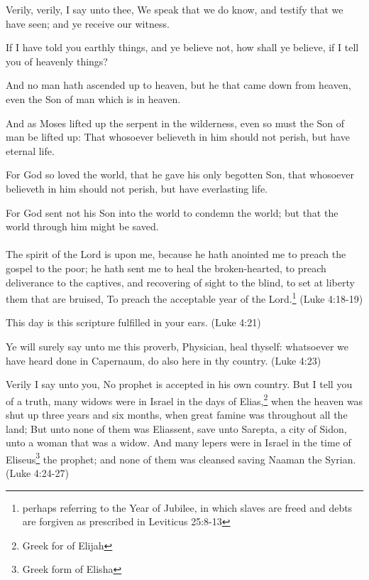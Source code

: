 Verily, verily, I say unto thee, We speak that we do know, and testify that we have seen; and ye receive our witness.

If I have told you earthly things, and ye believe not, how shall ye believe, if I tell you of heavenly things?

And no man hath ascended up to heaven, but he that came down from heaven, even the Son of man which is in heaven.

And as Moses lifted up the serpent in the wilderness, even so must the Son of man be lifted up: That whosoever believeth in him should not perish, but have eternal life.

For God so loved the world, that he gave his only begotten Son, that whosoever believeth in him should not perish, but have everlasting life. 

For God sent not his Son into the world to condemn the world; but that the world through him might be saved.

\paragraph{} The spirit of the Lord is upon me, because he hath anointed me to preach the gospel to the poor; he hath sent me to heal the broken-hearted, to preach deliverance to the captives, and recovering of sight to the blind, to set at liberty them that are bruised, To preach the acceptable year of the Lord.\footnote{perhaps referring to the Year of Jubilee, in which slaves are freed and debts are forgiven as prescribed in Leviticus 25:8-13} (Luke 4:18-19)

This day is this scripture fulfilled in your ears. (Luke 4:21)

Ye will surely say unto me this proverb, Physician, heal thyself: whatsoever we have heard done in Capernaum, do also here in thy country. (Luke 4:23)

Verily I say unto you, No prophet is accepted in his own country. But I tell you of a truth, many widows were in Israel in the days of Elias,\footnote{Greek for of Elijah} when the heaven was shut up three years and six months, when great famine was throughout all the land; But unto none of them was Elias\footnotemark[\value{footnote}] sent, save unto Sarepta, a city of Sidon, unto a woman that was a widow. And many lepers were in Israel in the time of Eliseus\footnote{Greek form of Elisha} the prophet; and none of them was cleansed saving Naaman the Syrian. (Luke 4:24-27)

